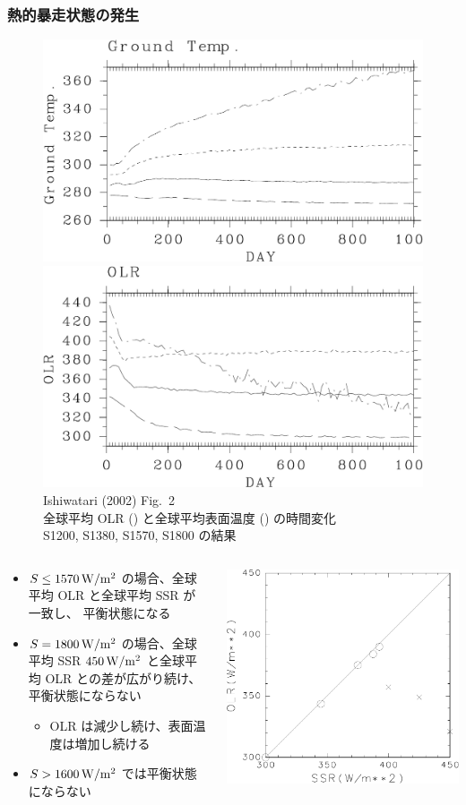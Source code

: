 \documentclass[aspectratio=149,9pt,]{beamer}
\begin{document}
\begin{frame}
	\frametitle{熱的暴走状態の発生}
	\begin{figure}
		\scriptsize
		\includegraphics[width=.45\textwidth]{./fig/Tg-seqs.kps-crop.pdf}
		\includegraphics[width=.45\textwidth]{./fig/OLR-seqs.kps-crop.pdf}\\
		Ishiwatari \etal (2002) Fig.~2\\
		全球平均 OLR () と全球平均表面温度 () の時間変化\\
		S1200, S1380, S1570, S1800 の結果
	\end{figure}
	\begin{columns}[T,onlytextwidth]
		\begin{column}{.7\textwidth}
			\begin{itemize}
				\item \(S\leq1570\hmu{W/m^2}\) の場合、全球平均 OLR と全球平均 SSR が一致し、
					平衡状態になる
				\item \(S=1800\hmu{W/m^2}\) の場合、全球平均 SSR \(450\hmu{W/m^2}\) と全球平均
					OLR との差が広がり続け、平衡状態にならない
					\begin{itemize}
						\item OLR は減少し続け、表面温度は増加し続ける
					\end{itemize}
				\item \(S>1600\hmu{W/m^2}\) では平衡状態にならない
			\end{itemize}
		\end{column}
		\begin{column}{.3\textwidth}
			\centering\scriptsize
			\includegraphics[width=.7\textwidth]{./fig/ISR-OLR.kps-crop.pdf}\\

\end{column}
\end{columns}
\end{frame}
\end{document}
